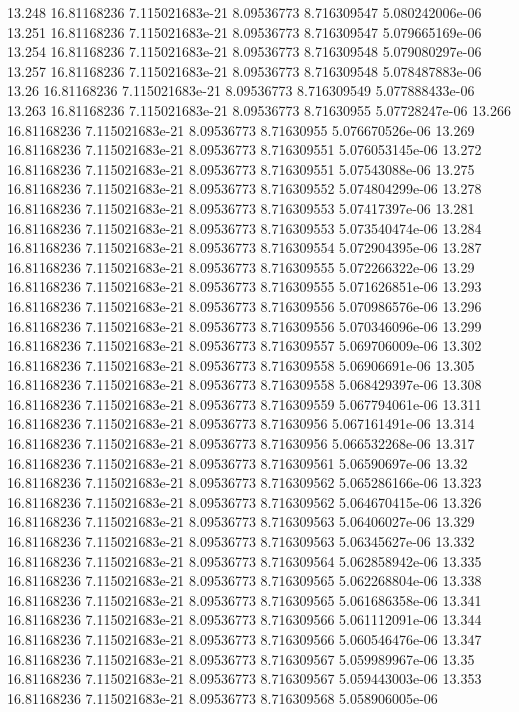{13.248 16.81168236 7.115021683e-21 8.09536773 8.716309547 5.080242006e-06
13.251 16.81168236 7.115021683e-21 8.09536773 8.716309547 5.079665169e-06
13.254 16.81168236 7.115021683e-21 8.09536773 8.716309548 5.079080297e-06
13.257 16.81168236 7.115021683e-21 8.09536773 8.716309548 5.078487883e-06
13.26 16.81168236 7.115021683e-21 8.09536773 8.716309549 5.077888433e-06
13.263 16.81168236 7.115021683e-21 8.09536773 8.71630955 5.07728247e-06
13.266 16.81168236 7.115021683e-21 8.09536773 8.71630955 5.076670526e-06
13.269 16.81168236 7.115021683e-21 8.09536773 8.716309551 5.076053145e-06
13.272 16.81168236 7.115021683e-21 8.09536773 8.716309551 5.07543088e-06
13.275 16.81168236 7.115021683e-21 8.09536773 8.716309552 5.074804299e-06
13.278 16.81168236 7.115021683e-21 8.09536773 8.716309553 5.07417397e-06
13.281 16.81168236 7.115021683e-21 8.09536773 8.716309553 5.073540474e-06
13.284 16.81168236 7.115021683e-21 8.09536773 8.716309554 5.072904395e-06
13.287 16.81168236 7.115021683e-21 8.09536773 8.716309555 5.072266322e-06
13.29 16.81168236 7.115021683e-21 8.09536773 8.716309555 5.071626851e-06
13.293 16.81168236 7.115021683e-21 8.09536773 8.716309556 5.070986576e-06
13.296 16.81168236 7.115021683e-21 8.09536773 8.716309556 5.070346096e-06
13.299 16.81168236 7.115021683e-21 8.09536773 8.716309557 5.069706009e-06
13.302 16.81168236 7.115021683e-21 8.09536773 8.716309558 5.06906691e-06
13.305 16.81168236 7.115021683e-21 8.09536773 8.716309558 5.068429397e-06
13.308 16.81168236 7.115021683e-21 8.09536773 8.716309559 5.067794061e-06
13.311 16.81168236 7.115021683e-21 8.09536773 8.71630956 5.067161491e-06
13.314 16.81168236 7.115021683e-21 8.09536773 8.71630956 5.066532268e-06
13.317 16.81168236 7.115021683e-21 8.09536773 8.716309561 5.06590697e-06
13.32 16.81168236 7.115021683e-21 8.09536773 8.716309562 5.065286166e-06
13.323 16.81168236 7.115021683e-21 8.09536773 8.716309562 5.064670415e-06
13.326 16.81168236 7.115021683e-21 8.09536773 8.716309563 5.06406027e-06
13.329 16.81168236 7.115021683e-21 8.09536773 8.716309563 5.06345627e-06
13.332 16.81168236 7.115021683e-21 8.09536773 8.716309564 5.062858942e-06
13.335 16.81168236 7.115021683e-21 8.09536773 8.716309565 5.062268804e-06
13.338 16.81168236 7.115021683e-21 8.09536773 8.716309565 5.061686358e-06
13.341 16.81168236 7.115021683e-21 8.09536773 8.716309566 5.061112091e-06
13.344 16.81168236 7.115021683e-21 8.09536773 8.716309566 5.060546476e-06
13.347 16.81168236 7.115021683e-21 8.09536773 8.716309567 5.059989967e-06
13.35 16.81168236 7.115021683e-21 8.09536773 8.716309567 5.059443003e-06
13.353 16.81168236 7.115021683e-21 8.09536773 8.716309568 5.058906005e-06
}

